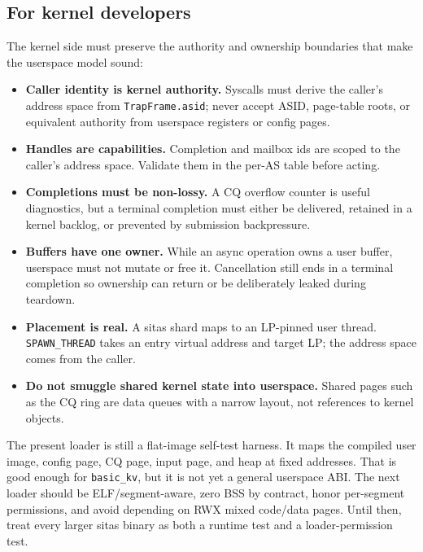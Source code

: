 \subsection{For kernel developers}

The kernel side must preserve the authority and ownership boundaries that make
the userspace model sound:
\begin{itemize}
    \item \textbf{Caller identity is kernel authority.} Syscalls must derive the
        caller's address space from \texttt{TrapFrame.asid}; never accept ASID,
        page-table roots, or equivalent authority from userspace registers or
        config pages.
    \item \textbf{Handles are capabilities.} Completion and mailbox ids are
        scoped to the caller's address space. Validate them in the per-AS table
        before acting.
    \item \textbf{Completions must be non-lossy.} A CQ overflow counter is
        useful diagnostics, but a terminal completion must either be delivered,
        retained in a kernel backlog, or prevented by submission backpressure.
    \item \textbf{Buffers have one owner.} While an async operation owns a user
        buffer, userspace must not mutate or free it. Cancellation still ends in
        a terminal completion so ownership can return or be deliberately leaked
        during teardown.
    \item \textbf{Placement is real.} A sitas shard maps to an LP-pinned user
        thread. \texttt{SPAWN\_THREAD} takes an entry virtual address and target
        LP; the address space comes from the caller.
    \item \textbf{Do not smuggle shared kernel state into userspace.} Shared
        pages such as the CQ ring are data queues with a narrow layout, not
        references to kernel objects.
\end{itemize}

The present loader is still a flat-image self-test harness. It maps the
compiled user image, config page, CQ page, input page, and heap at fixed
addresses. That is good enough for \texttt{basic\_kv}, but it is not yet a
general userspace ABI. The next loader should be ELF/segment-aware, zero BSS by
contract, honor per-segment permissions, and avoid depending on RWX mixed
code/data pages. Until then, treat every larger sitas binary as both a runtime
test and a loader-permission test.

\endinput
